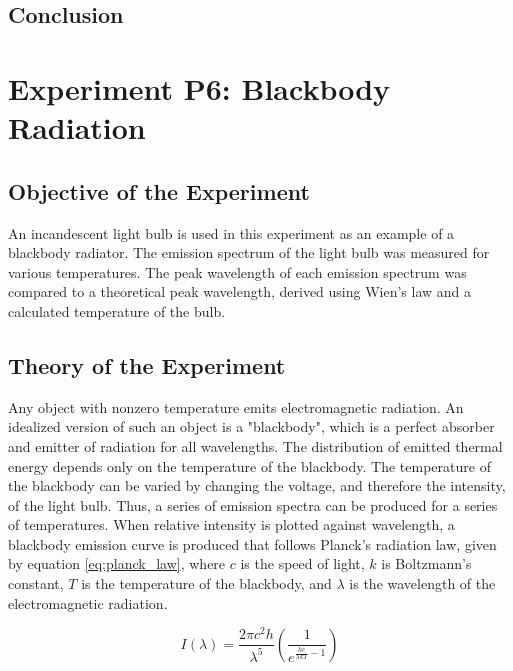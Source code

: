 \documentclass[a4paper]{article}
\begin{document}
\subsection{Conclusion}

\qq %

\section{Experiment P6: Blackbody Radiation}

\subsection{Objective of the Experiment}
\qq An incandescent light bulb is used in this experiment as an example of a blackbody radiator. The emission spectrum of the light bulb was measured for various temperatures. The peak wavelength of each emission spectrum was compared to a theoretical peak wavelength, derived using Wien's law and a calculated temperature of the bulb.

\subsection{Theory of the Experiment}

\qq Any object with nonzero temperature emits electromagnetic radiation. An idealized version of such an object is a "blackbody", which is a perfect absorber and emitter of radiation for all wavelengths. The distribution of emitted thermal energy depends only on the temperature of the blackbody. The temperature of the blackbody can be varied by changing the voltage, and therefore the intensity, of the light bulb. Thus, a series of emission spectra can be produced for a series of temperatures. When relative intensity is plotted against wavelength, a blackbody emission curve is produced that follows Planck's radiation law, given by equation \ref{eq:planck_law}, where $c$ is the speed of light, $k$ is Boltzmann's constant, $T$ is the temperature of the blackbody, and $\lambda$ is the wavelength of the electromagnetic radiation.

\begin{equation}
\label{eq:planck_law}
I \left( \lambda \right) = 
\frac{2 \pi c^2 h}{\lambda^5}
\left( \frac{1}{e^{\frac{hc}{\lambda k T} - 1}} \right)
\end{equation}
\end{document}
